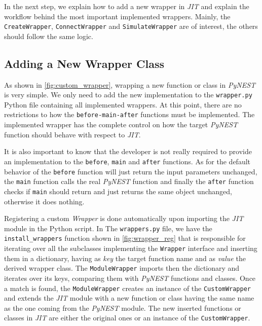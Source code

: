    In the next step, we explain how to add a new wrapper in \emph{JIT} and explain the workflow behind the most important implemented wrappers. Mainly, the \texttt{CreateWrapper}, \texttt{ConnectWrapper} and \texttt{SimulateWrapper} are of interest, the others should follow the same logic.
   
   
\subsection{Adding a New Wrapper Class}

As shown in \autoref{fig:custom_wrapper}, wrapping a new function or class in \emph{PyNEST} is very simple. We only need to add the new implementation to the \texttt{wrapper.py} Python file containing all implemented wrappers. At this point, there are no restrictions to how the \texttt{before-main-after} functions must be implemented. The implemented wrapper has the complete  control on how the target \emph{PyNEST} function should behave with respect to \emph{JIT}.


It is also important to know that the developer is not really required to provide an  implementation to the \texttt{before}, \texttt{main} and \texttt{after} functions. As for the default behavior of the \texttt{before} function will just return the input parameters unchanged, the \texttt{main} function calls the real \emph{PyNEST} function and finally the \texttt{after} function checks if \texttt{main} should return and just returns the same object unchanged, otherwise it does nothing.

Registering a custom \emph{Wrapper} is done automatically upon importing the \emph{JIT} module in the Python script. In The \texttt{wrappers.py} file, we have the \texttt{install\_wrappers} function shown in \autoref{fig:wrapper_reg} that is responsible for iterating over all the subclasses implementing the \texttt{Wrapper} interface and inserting them in a dictionary, having as \emph{key} the target function name and as \emph{value} the derived wrapper class. The \texttt{ModuleWrapper} imports then the dictionary and iterates over its keys, comparing them with \emph{PyNEST} functions and classes. Once a match is found, the \texttt{ModuleWrapper} creates an instance of the \texttt{CustomWrapper} and extends the \emph{JIT} module with a new function or class having the same name as the one coming from the \emph{PyNEST} module. The new inserted functions or classes in \emph{JIT} are either the original ones or an instance of the \texttt{CustomWrapper}.

